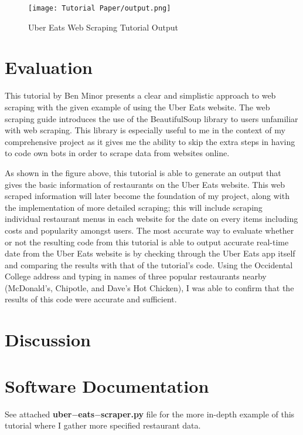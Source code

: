 \documentclass[10pt,twocolumn]{article}
\begin{document}
\begin{figure}
    \centering
    \texttt{[image: Tutorial Paper/output.png]}
    \caption{
        Uber Eats Web Scraping Tutorial Output
    }
    \label{fig:second-page}
\end{figure}

\section{Evaluation}

This tutorial by Ben Minor presents a clear and simplistic approach to web scraping with the given example of using the Uber Eats website. The web scraping guide introduces the use of the BeautifulSoup library to users unfamiliar with web scraping. This library is especially useful to me in the context of my comprehensive project as it gives me the ability to skip the extra steps in having to code own bots in order to scrape data from websites online. 

As shown in the figure above, this tutorial is able to generate an output that gives the basic information of restaurants on the Uber Eats website. This web scraped information will later become the foundation of my project, along with the implementation of more detailed scraping; this will include scraping individual restaurant menus in each website for the date on every items including costs and popularity amongst users. The most accurate way to evaluate whether or not the resulting code from this tutorial is able to output accurate real-time date from the Uber Eats website is by checking through the Uber Eats app itself and comparing the results with that of the tutorial's code. Using the Occidental College address and typing in names of three popular restaurants nearby (McDonald's, Chipotle, and Dave's Hot Chicken), I was able to confirm that the results of this code were accurate and sufficient.

\section{Discussion}



\section{Software Documentation}

See attached \textbf{uber$-$eats$-$scraper.py} file for the more in-depth example of this tutorial where I gather more specified restaurant data.

\printbibliography 
\end{document}
